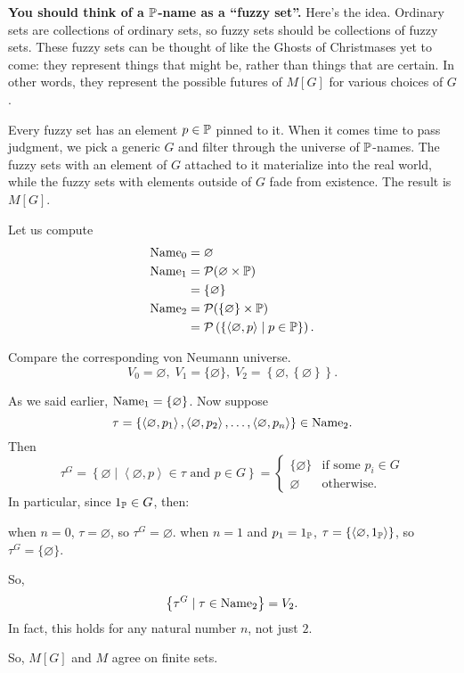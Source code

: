 \textbf{You should think of a $\mathbb P$-name as a ``fuzzy set''.}
Here's the idea.
Ordinary sets are collections of ordinary sets,
so fuzzy sets should be collections of fuzzy sets.
These fuzzy sets can be thought of like the Ghosts of Christmases yet to come:
they represent things that might be, rather than things that are certain.
In other words, they represent the possible futures of $M[G]$ for various choices of $G$.

Every fuzzy set has an element $p \in \mathbb P$ pinned to it.
When it comes time to pass judgment,
we pick a generic $G$ and filter through the universe of $\mathbb P$-names.
The fuzzy sets with an element of $G$ attached to it materialize into the real world,
while the fuzzy sets with elements outside of $G$ fade from existence.
The result is $M[G]$.

\begin{example}
	Let us compute
	\begin{align*}
		\text{Name}_0 &= \varnothing \\
		\text{Name}_1 &= \mathcal P(\varnothing \times \mathbb P) \\
		&= \{\varnothing\} \\
		\text{Name}_2 &= \mathcal P(\{\varnothing\} \times \mathbb P) \\
		&= \mathcal P\left( \left\{
			\left<\varnothing, p\right>
			\mid p \in \mathbb P
		\right\} \right).
	\end{align*}
\end{example}
Compare the corresponding von Neumann universe.
\[ V_0 = \varnothing, \; V_1 = \{\varnothing\}, \;
V_2 = \left\{ \varnothing, \left\{ \varnothing \right\} \right\}. \]

\begin{example}
	As we said earlier, $\text{Name}_1 = \{\varnothing\}$.
	Now suppose
	\[ \tau =
		\left\{
			\left<\varnothing, p_1\right>,
			\left<\varnothing, p_2\right>,
			\dots,
			\left<\varnothing, p_n\right>
		\right\}
		\in \text{Name}_2. \]
	Then
	\[
		\tau^G
		= \left\{ \varnothing \mid
		\left<\varnothing, p\right> \in \tau \text{ and } p \in G\right\}
		=
		\begin{cases}
			\{\varnothing\} & \text{if some } p_i \in G \\
			\varnothing & \text{otherwise}.
		\end{cases}
	\]
	In particular, since $1_\mathbb P \in G$, then:
	\begin{itemize}
		\ii when $n = 0$, $\tau = \varnothing$, so $\tau^G = \varnothing$.
		\ii when $n = 1$ and $p_1 = 1_\mathbb P$, $\tau = \{ \langle \varnothing, 1_\mathbb P \rangle \}$,
		so $\tau^G = \{ \varnothing \}$.
	\end{itemize}
	So,
	\[ \left\{ \tau^G \mid \tau \in \text{Name}_2 \right\} = V_2. \]
	In fact, this holds for any natural number $n$, not just $2$.
\end{example}
So, $M[G]$ and $M$ agree on finite sets.

